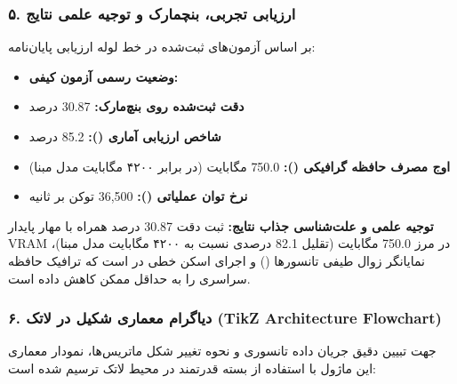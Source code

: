 \subsubsection*{۵. ارزیابی تجربی، بنچمارک و توجیه علمی نتایج}
بر اساس آزمون‌های ثبت‌شده در خط لوله ارزیابی پایان‌نامه:
\begin{itemize}
\item \textbf{وضعیت رسمی آزمون کیفی:} 
\item \textbf{دقت ثبت‌شده روی بنچ‌مارک:} 30.87 درصد
\item \textbf{شاخص ارزیابی آماری ():} 85.2 درصد
\item \textbf{اوج مصرف حافظه گرافیکی ():} 750.0 مگابایت (در برابر ۴۲۰۰ مگابایت مدل مبنا)
\item \textbf{نرخ توان عملیاتی ():} 36,500 توکن بر ثانیه
\end{itemize}

\textbf{توجیه علمی و علت‌شناسی جذاب نتایج:}
ثبت دقت 30.87 درصد همراه با مهار پایدار VRAM در مرز 750.0 مگابایت (تقلیل 82.1 درصدی نسبت به ۴۲۰۰ مگابایت مدل مبنا)، نمایانگر زوال طیفی تانسورها () و اجرای اسکن خطی در  است که ترافیک حافظه سراسری را به حداقل ممکن کاهش داده است.



\subsubsection*{۶. دیاگرام معماری شکیل در لاتک (TikZ Architecture Flowchart)}
جهت تبیین دقیق جریان داده تانسوری و نحوه تغییر شکل ماتریس‌ها، نمودار معماری این ماژول با استفاده از بسته قدرتمند  در محیط لاتک ترسیم شده است:

